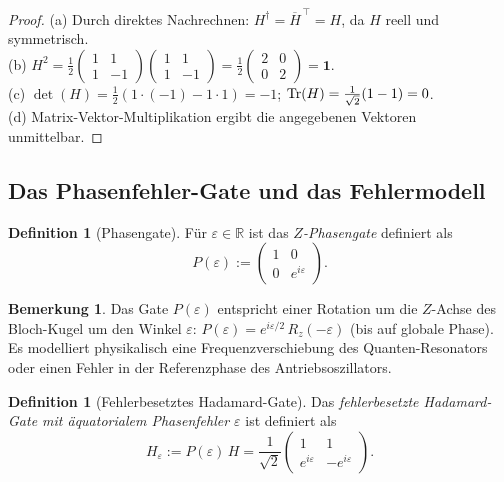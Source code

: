 ﻿\documentclass[11pt,a4paper]{article}
\theoremstyle{definition}
\newtheorem{definition}[theorem]{Definition}
\newtheorem{remark}[theorem]{Bemerkung}
\newcommand{\eps}{\varepsilon}
\newcommand{\Heps}{H_{\!\varepsilon}}
\newcommand{\R}{\mathbb{R}}
\begin{document}
\begin{proof}
  (a) Durch direktes Nachrechnen:
  $H^\dagger = \overline{H}^{\,\top} = H$, da $H$ reell und symmetrisch.\\
  (b) $H^2 = \frac{1}{2}\begin{pmatrix}1&1\\1&-1\end{pmatrix}
  \begin{pmatrix}1&1\\1&-1\end{pmatrix}
  = \frac{1}{2}\begin{pmatrix}2&0\\0&2\end{pmatrix} = \mathbf{1}$.\\
  (c) $\det(H)= \frac{1}{2}(1\cdot(-1)-1\cdot 1)=-1$; $\Tr(H)=\frac{1}{\sqrt{2}}(1-1)=0$.\\
  (d) Matrix-Vektor-Multiplikation ergibt die angegebenen Vektoren unmittelbar.
\end{proof}

\subsection{Das Phasenfehler-Gate und das Fehlermodell}
\label{subsec:error_model}

\begin{definition}[Phasengate]
  Für $\eps\in\R$ ist das \emph{$Z$-Phasengate} definiert als
  \begin{equation}
    P(\eps) := \begin{pmatrix} 1 & 0 \\ 0 & e^{i\eps} \end{pmatrix}.
    \label{eq:P_def}
  \end{equation}
\end{definition}

\begin{remark}
  Das Gate $P(\eps)$ entspricht einer Rotation um die $Z$-Achse des
  Bloch-Kugel um den Winkel $\eps$: $P(\eps) = e^{i\eps/2}\,R_z(-\eps)$
  (bis auf globale Phase).  Es modelliert physikalisch eine
  Frequenzverschiebung des Quanten-Resonators oder einen Fehler in der
  Referenzphase des Antriebsoszillators.
\end{remark}

\begin{definition}[Fehlerbesetztes Hadamard-Gate]
  Das \emph{fehlerbesetzte Hadamard-Gate mit äquatorialem Phasenfehler $\eps$}
  ist definiert als
  \begin{equation}
    \Heps := P(\eps)\,H
    = \frac{1}{\sqrt{2}} \begin{pmatrix} 1 & 1 \\ e^{i\eps} & -e^{i\eps} \end{pmatrix}.
    \label{eq:Heps_def}
  \end{equation}
\end{definition}
\end{document}
